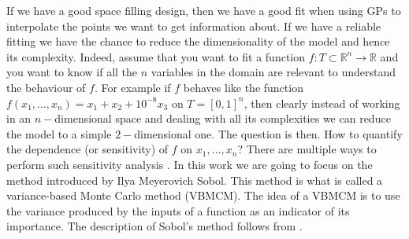 \documentclass[12pt]{book}
\begin{document}
 
If we have a good space filling design, then we have a good fit when using GPs to interpolate  the 
points we want to get information about. If we have a reliable fitting we have the chance
to reduce the dimensionality of the model and hence its complexity. Indeed, assume that
you want to fit a function  $f:T\subset \mathbb{R}^{n}\longrightarrow\mathbb{R}$ and you want to 
know if all the $n$ variables in the domain are relevant to understand  the behaviour of $f$. For 
example if $f$ behaves like the function $f(x_{1},\ldots,x_{n})=x_{1}+x_{2}+10^{-8}x_{3}$ on $T=[0,1]^{n}$, 
then clearly 
instead of working in an $n-$dimensional space and dealing with all its complexities we can
reduce the model to a simple $2-$dimensional one. The question is then. How to quantify the 
dependence (or sensitivity) of $f$ on $x_{1},\ldots,x_{n}$? There are multiple ways to perform such
sensitivity analysis \cite{saltelli2000sensitivity}. In this work we are going to focus on
the method  introduced
by Ilya Meyerovich Sobol. This method is what is called a variance-based Monte Carlo method (VBMCM).
The idea of a VBMCM is to use the variance produced by  the inputs of a function as an indicator of its importance.
The description of Sobol's method follows from \cite{saltelli2000sensitivity}.
\end{document}
